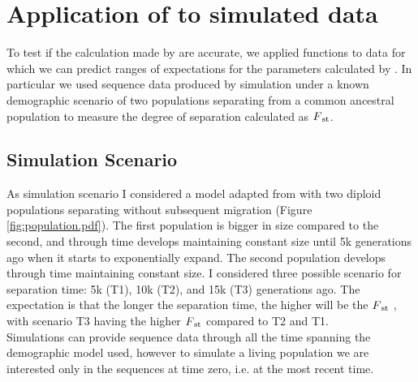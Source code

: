 \section{Application of \vgp to simulated data}
To test if the calculation made by \vgp are accurate, we applied \vgp functions to data for which we can predict ranges of expectations for the parameters calculated by \vgp. In particular we used sequence data produced by simulation under a known demographic scenario of two populations separating from a common ancestral population to measure the degree of separation calculated as $F\textsubscript{st}$. 




\subsection{Simulation Scenario}

As simulation scenario I considered a model adapted from \cite{hudson2004ms} with two diploid populations separating without subsequent migration (Figure \ref{fig:population.pdf}). The first population is bigger in size compared to the second, and through time develops maintaining constant size until 5k generations ago when it starts to exponentially expand. The second population develops through time maintaining constant size. I considered three possible scenario for separation time: 5k (T1), 10k (T2), and 15k (T3) generations ago. The expectation is that the longer the separation time, the higher will be the $F\textsubscript{st}$ , with scenario T3 having the higher $F\textsubscript{st}$ compared to T2 and T1. \\

Simulations can provide sequence data through all the time spanning the demographic model used, however to simulate a living population we are interested only in the sequences at time zero, i.e. at the most recent time.\\

